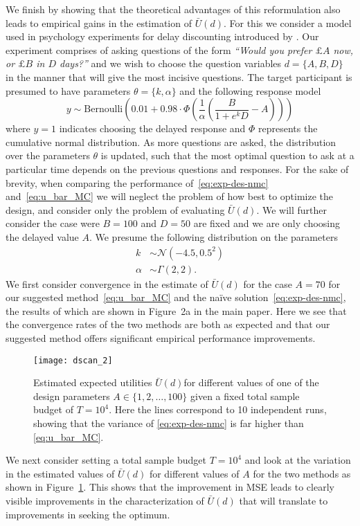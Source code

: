 We finish by showing that the theoretical advantages of this reformulation also leads to empirical gains in the estimation of $\bar{U}(d)$.  For this we consider a model used in psychology experiments for delay discounting introduced by \cite{vincent2016hierarchical}.  Our experiment comprises of asking questions of the form \emph{``Would you prefer $\pounds A$ now, or $\pounds B$ in $D$ days?''} and we wish to choose the question  variables $d = \{A,B,D\}$ in the manner that will give the most incisive questions.  The target participant is presumed to have parameters $\theta=\{k,\alpha\}$ and the following response model
\begin{equation}
y \sim \mathrm{Bernoulli} \left(0.01 + 0.98 \cdot \Phi\left(\frac{1}{\alpha} \left(\frac{B}{1+e^k D}-A\right)\right)\right)
\end{equation}
where $y=1$ indicates choosing the delayed response and $\Phi$ represents the cumulative normal distribution.  As more questions are asked, the distribution over the parameters $\theta$ is updated, such
that the most optimal question to ask at a particular time depends on the previous questions
and responses.  For the sake of brevity, when comparing the performance of~\eqref{eq:exp-des-nmc} and~\eqref{eq:u_bar_MC} we will neglect the problem of how best to optimize the design, and consider
only the problem of evaluating $\bar{U}(d)$.  We will further consider the case were $B=100$ and $D = 50$ are fixed and we are only choosing the delayed value $A$.
We presume the following distribution on the parameters
\begin{align*}
k &\sim \mathcal{N}(-4.5,0.5^2) \\
\alpha &\sim \Gamma(2,2).
\end{align*}
We first consider convergence in the estimate of $\bar{U}(d)$ for the case $A=70$ for our suggested method~\eqref{eq:u_bar_MC} and the na\"{i}ve solution~\eqref{eq:exp-des-nmc}, the results of which are shown in Figure~2a in the main paper. 
Here we see that the convergence rates of the two methods are both as expected and that our suggested method offers significant empirical performance improvements.  

\begin{figure}[t]
		\centering
		\texttt{[image: dscan\_2]}
		\caption{Estimated expected utilities $\bar{U}(d)$for 
		different values of one of the design parameters $A \in \{1,2,\dots,100\}$ given a fixed total
		sample budget of $T=10^4$.  Here the lines correspond to 10 independent runs, showing
		that the variance of \eqref{eq:exp-des-nmc} is far higher than \eqref{eq:u_bar_MC}.\label{fig:exp-d-scan}}
\end{figure}


We next consider setting a total sample budget $T=10^4$ and look at the variation in the estimated values of $\bar{U}(d)$ for different values of $A$ for the two methods as shown in Figure~\ref{fig:exp-d-scan}.
This shows that the improvement in MSE leads to clearly visible improvements in the characterization of $\bar{U}(d)$ that
will translate to improvements in seeking the optimum.
